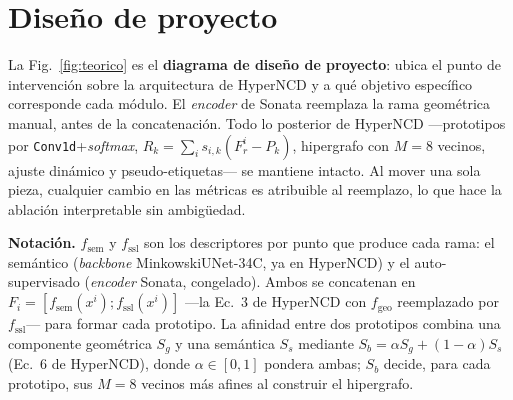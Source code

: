 \documentclass[9.5pt,twocolumn,a4paper]{article}
\begin{document}
\section{Diseño de proyecto}
La Fig.~\ref{fig:teorico} es el \textbf{diagrama de diseño de proyecto}: ubica
el punto de intervención sobre la arquitectura de HyperNCD y a qué objetivo
específico corresponde cada módulo. El \emph{encoder} de Sonata reemplaza la
rama geométrica manual, antes de la concatenación. Todo lo posterior de
HyperNCD ---prototipos por \texttt{Conv1d}+\emph{softmax},
$R_k=\sum_i s_{i,k}(F^i_r-P_k)$, hipergrafo con $M{=}8$ vecinos, ajuste
dinámico y pseudo-etiquetas--- se mantiene intacto. Al mover una sola pieza,
cualquier cambio en las métricas es atribuible al reemplazo, lo que hace la
ablación interpretable sin ambigüedad.

\textbf{Notación.} $f_{\mathrm{sem}}$ y $f_{\mathrm{ssl}}$ son los
descriptores por punto que produce cada rama: el semántico
(\emph{backbone} MinkowskiUNet-34C, ya en HyperNCD) y el auto-supervisado
(\emph{encoder} Sonata, congelado). Ambos se concatenan en
$F_i=[f_{\mathrm{sem}}(x^i);f_{\mathrm{ssl}}(x^i)]$ ---la Ec.~3 de HyperNCD
con $f_{\mathrm{geo}}$ reemplazado por $f_{\mathrm{ssl}}$--- para formar cada
prototipo. La afinidad entre dos prototipos combina una componente
geométrica $S_g$ y una semántica $S_s$ mediante
$S_b=\alpha S_g+(1-\alpha)S_s$ (Ec.~6 de HyperNCD), donde $\alpha\in[0,1]$
pondera ambas; $S_b$ decide, para cada prototipo, sus $M{=}8$ vecinos más
afines al construir el hipergrafo.
\end{document}
